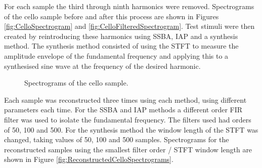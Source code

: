 		For each sample the third through ninth harmonics were removed. Spectrograms of the cello sample before and
		after this process are shown in Figures \ref{fig:CelloSpectrogram} and \ref{fig:CelloFilteredSpectrogram}.
		Test stimuli were then created by reintroducing these harmonics using SSBA, IAP and a synthesis method.
		The synthesis method consisted of using the STFT to measure the amplitude envelope of the fundamental
		frequency and applying this to a synthesised sine wave at the frequency of the desired harmonic. 

		\begin{figure}[h!]
			\centering
			\qquad
			\caption{Spectrograms of the cello sample.}
			\label{fig:CelloSpectrograms}
		\end{figure}

		Each sample was reconstructed three times using each method, using different parameters each time. For the
		SSBA and IAP methods a different order FIR filter was used to isolate the fundamental frequency. The
		filters used had orders of 50, 100 and 500. For the synthesis method the window length of the STFT was
		changed, taking values of 50, 100 and 500 samples. Spectrograms for the reconstructed samples using the
		smallest filter order / STFT window length are shown in Figure \ref{fig:ReconstructedCelloSpectrograms}.

